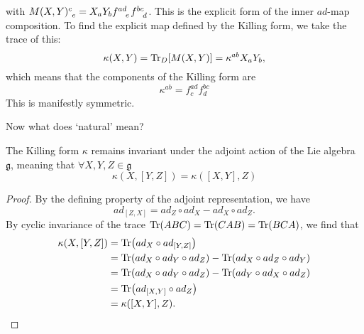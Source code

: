 with $M(X, Y) \indices{^c_e} = X_a Y_b f \indices{^{ad}_e} f\indices{^{bc}_{d}}$. This is the explicit form of the inner $ad$-map composition.
To find the explicit map defined by the Killing form, we take the trace of this:
\begin{equation}
  \kappa(X, Y) = \Tr_D [M(X, Y)] = \kappa^{ab} X_a Y_b,
\end{equation}
which means that the components of the Killing form are
\begin{equation}
  \boxed{\kappa^{ab} = f^{ad}_c f^{bc}_d}
\end{equation}
This is manifestly symmetric.

Now what does `natural' mean? 
\begin{claim}
  The Killing form $\kappa$ remains invariant under the adjoint action of the Lie algebra $\mathfrak{g}$, meaning that $\forall X, Y, Z \in \mathfrak{g}$
  \begin{equation}
    \label{eq:killing-invariance}
    \kappa(X, [Y, Z]) = \kappa([X, Y], Z)
  \end{equation}
\end{claim}
\begin{proof}
  By the defining property of the adjoint representation, we have
  \begin{equation}
    ad_{[Z, X]} = ad_Z \circ ad_X - ad_X \circ ad_Z.
  \end{equation}
  By cyclic invariance of the trace $\Tr(ABC) = \Tr(CAB) = \Tr(BCA)$, we find that
  \begin{align}
    \kappa(X, [Y, Z]) &= \Tr(ad_X \circ ad_{[Y, Z]}) \\
		      &= \Tr(ad_X \circ ad_Y \circ ad_Z) - \Tr(ad_X \circ ad_Z \circ ad_Y) \\
		      &= \Tr(ad_X \circ ad_Y \circ ad_Z) - \Tr(ad_Y \circ ad_X \circ ad_Z) \\
		      &= \Tr(ad_{[X, Y]} \circ ad_Z) \\
		      &= \kappa([X, Y], Z).
  \end{align}
\end{proof}

